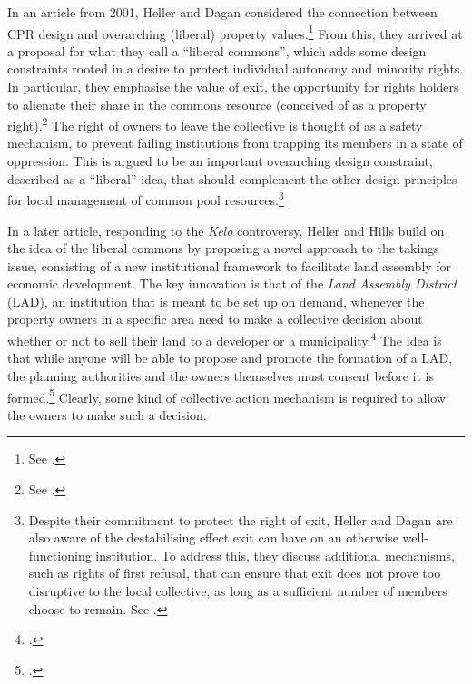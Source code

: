 In an article from 2001, Heller and Dagan considered the connection between CPR design and overarching (liberal) property values.\footnote{See \cite{heller01}.} From this, they arrived at a proposal for what they call a ``liberal commons'', which adds some design constraints rooted in a desire to protect individual autonomy and minority rights. In particular, they emphasise the value of exit, the opportunity for rights holders to alienate their share in the commons resource (conceived of as a property right).\footnote{See \cite[567-572]{heller01}.} The right of owners to leave the collective is thought of as a safety mechanism, to prevent failing institutions from trapping its members in a state of oppression. This is argued to be an important overarching design constraint, described as a ``liberal'' idea, that should complement the other design principles for local management of common pool resources.\footnote{Despite their commitment to protect the right of exit, Heller and Dagan are also aware of the destabilising effect exit can have on an otherwise well-functioning institution. To address this, they discuss additional mechanisms, such as rights of first refusal, that can ensure that exit does not prove too disruptive to the local collective, as long as a sufficient number of members choose to remain. See \cite[596-702]{heller01}.}

In a later article, responding to the {\it Kelo} controversy, Heller and Hills build on the idea of the liberal commons by proposing a novel approach to the takings issue, consisting of a new institutional framework to facilitate land assembly for economic development. The key innovation is that of the {\it Land Assembly District} (LAD), an institution that is meant to be set up on demand, whenever the property owners in a specific area need to make a collective decision about whether or not to sell their land to a developer or a municipality.\footcite[1469-1470]{heller08} The idea is that while anyone will be able to propose and promote the formation of a LAD, the planning authorities and the owners themselves must consent before it is formed.\footcite[1488-1489]{heller08} Clearly, some kind of collective action mechanism is required to allow the owners to make such a decision. 

